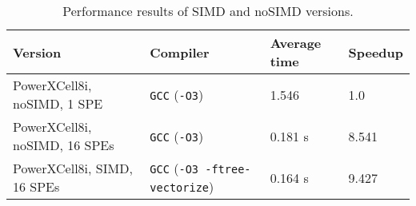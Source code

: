 \documentclass[envcountsame,envcountchap]{svmono}
\begin{document}
\begin{table}[htb]
\begin{footnotesize}
\caption{Performance results of SIMD and noSIMD versions.}
\label{tab:t1}
\newcommand{\m}{\hphantom{$-$}}
\newcommand{\cc}[1]{\multicolumn{1}{c}{#1}}
\renewcommand{\tabcolsep}{0.5pc} %
\renewcommand{\arraystretch}{1.2} %
\begin{tabular}{@{}llll}
\hline
\textbf{Version} & \textbf{Compiler} & \textbf{Average time} & \textbf{Speedup} \\
\hline
PowerXCell8i, noSIMD, 1 SPE & \texttt{GCC} (\texttt{-O3}) & 1.546 & 1.0 \\
PowerXCell8i, noSIMD, 16 SPEs & \texttt{GCC} (\texttt{-O3}) & 0.181 s &  8.541 \\
PowerXCell8i, SIMD, 16 SPEs & \texttt{GCC} (\texttt{-O3 -ftree-vectorize}) & 0.164 s & 9.427 \\
\hline
\end{tabular}\\[2pt]
\end{footnotesize}
\end{table}
\end{document}
